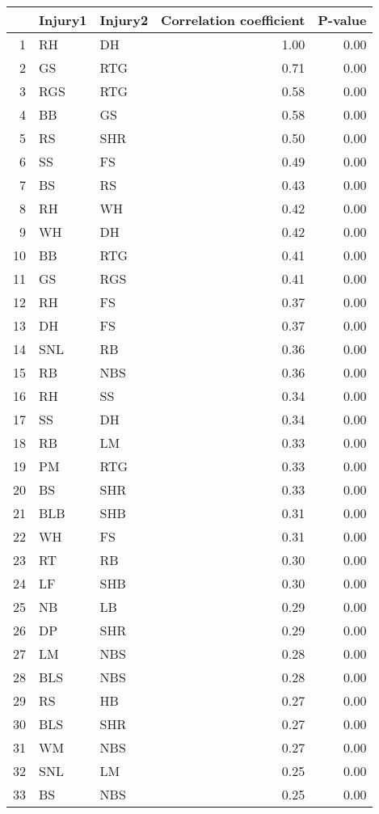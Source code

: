 \begin{table}[ht]
\centering
\begin{tabular}{rllrr}
  \hline
 & Injury1 & Injury2 & Correlation coefficient & P-value \\ 
  \hline
1 & RH & DH & 1.00 & 0.00 \\ 
  2 & GS & RTG & 0.71 & 0.00 \\ 
  3 & RGS & RTG & 0.58 & 0.00 \\ 
  4 & BB & GS & 0.58 & 0.00 \\ 
  5 & RS & SHR & 0.50 & 0.00 \\ 
  6 & SS & FS & 0.49 & 0.00 \\ 
  7 & BS & RS & 0.43 & 0.00 \\ 
  8 & RH & WH & 0.42 & 0.00 \\ 
  9 & WH & DH & 0.42 & 0.00 \\ 
  10 & BB & RTG & 0.41 & 0.00 \\ 
  11 & GS & RGS & 0.41 & 0.00 \\ 
  12 & RH & FS & 0.37 & 0.00 \\ 
  13 & DH & FS & 0.37 & 0.00 \\ 
  14 & SNL & RB & 0.36 & 0.00 \\ 
  15 & RB & NBS & 0.36 & 0.00 \\ 
  16 & RH & SS & 0.34 & 0.00 \\ 
  17 & SS & DH & 0.34 & 0.00 \\ 
  18 & RB & LM & 0.33 & 0.00 \\ 
  19 & PM & RTG & 0.33 & 0.00 \\ 
  20 & BS & SHR & 0.33 & 0.00 \\ 
  21 & BLB & SHB & 0.31 & 0.00 \\ 
  22 & WH & FS & 0.31 & 0.00 \\ 
  23 & RT & RB & 0.30 & 0.00 \\ 
  24 & LF & SHB & 0.30 & 0.00 \\ 
  25 & NB & LB & 0.29 & 0.00 \\ 
  26 & DP & SHR & 0.29 & 0.00 \\ 
  27 & LM & NBS & 0.28 & 0.00 \\ 
  28 & BLS & NBS & 0.28 & 0.00 \\ 
  29 & RS & HB & 0.27 & 0.00 \\ 
  30 & BLS & SHR & 0.27 & 0.00 \\ 
  31 & WM & NBS & 0.27 & 0.00 \\ 
  32 & SNL & LM & 0.25 & 0.00 \\ 
  33 & BS & NBS & 0.25 & 0.00 \\ 

\end{tabular}
\end{table}
